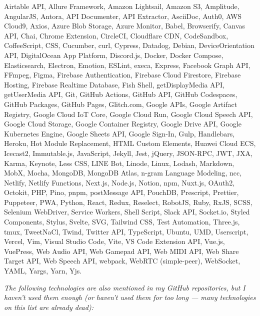 \documentclass[a4paper]{article}
\begin{document}
Airtable API, Allure Framework, Amazon Lightsail, Amazon S3, Amplitude, AngularJS, Antora, API Documenter, API Extractor, AsciiDoc, Auth0, AWS Cloud9, Axios, Azure Blob Storage, Azure Monitor, Babel, Browserify, Canvas API, Chai, Chrome Extension, CircleCI, Cloudflare CDN, CodeSandbox, CoffeeScript, CSS, Cucumber, curl, Cypress, Datadog, Debian, DeviceOrientation API, DigitalOcean App Platform, Discord.js, Docker, Docker Compose, Elasticsearch, Electron, Emotion, ESLint, execa, Express, Facebook Graph API, FFmpeg, Figma, Firebase Authentication, Firebase Cloud Firestore, Firebase Hosting, Firebase Realtime Database, Fish Shell, getDisplayMedia API, getUserMedia API, Git, GitHub Actions, GitHub API, GitHub Codespaces, GitHub Packages, GitHub Pages, Glitch.com, Google APIs, Google Artifact Registry, Google Cloud IoT Core, Google Cloud Run, Google Cloud Speech API, Google Cloud Storage, Google Container Registry, Google Drive API, Google Kubernetes Engine, Google Sheets API, Google Sign-In, Gulp, Handlebars, Heroku, Hot Module Replacement, HTML Custom Elements, Huawei Cloud ECS, Icecast2, Immutable.js, JavaScript, Jekyll, Jest, jQuery, JSON-RPC, JWT, JXA, Karma, Keynote, Less CSS, LINE Bot, Linode, Linux, Lodash, Markdown, MobX, Mocha, MongoDB, MongoDB Atlas, n-gram Language Modeling, ncc, Netlify, Netlify Functions, Next.js, Node.js, Notion, npm, Nuxt.js, OAuth2, Octokit, PHP, Pino, pnpm, postMessage API, PouchDB, Prescript, Prettier, Puppeteer, PWA, Python, React, Redux, Reselect, RobotJS, Ruby, RxJS, SCSS, Selenium WebDriver, Service Workers, Shell Script, Slack API, Socket.io, Styled Components, Stylus, Svelte, SVG, Tailwind CSS, Test Automation, Three.js, tmux, TweetNaCl, Twind, Twitter API, TypeScript, Ubuntu, UMD, Userscript, Vercel, Vim, Visual Studio Code, Vite, VS Code Extension API, Vue.js, VuePress, Web Audio API, Web Gamepad API, Web MIDI API, Web Share Target API, Web Speech API, webpack, WebRTC (simple-peer), WebSocket, YAML, Yargs, Yarn, Yjs.

\vspace{2mm}


\textit{The following technologies are also mentioned in my GitHub repositories, but I haven’t used them enough (or haven’t used them for too long — many technologies on this list are already dead):}

\vspace{2mm}
\end{document}
